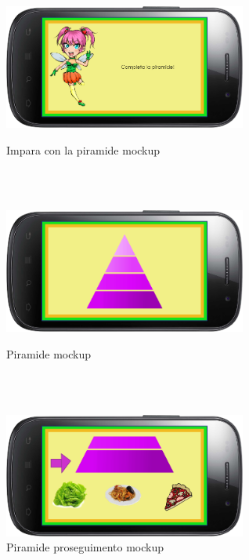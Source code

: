 \begin{figure}
 \begin{minipage}[c]{\columnwidth}
   \centering
   \includegraphics[width=8cm]{Images/Mockup/gioco1}
   \caption{Impara con la piramide mockup}
   \label{fig:Impara con la piramide}
 \end{minipage}
 \ \hspace{8mm} \hspace{8mm} \\\
 
 \begin{minipage}[c]{\columnwidth}
  \centering
   \includegraphics[width=8cm]{Images/Mockup/piramide}
   \caption{Piramide mockup}
   \label{fig:Piramide}
 \end{minipage}
 \ \hspace{8mm} \hspace{8mm} \\\
 
 \begin{minipage}[c]{\columnwidth}
  \centering
   \includegraphics[width=8cm]{Images/Mockup/piramide2}
   \caption{Piramide proseguimento mockup}
   \label{fig:Piramide proseguimento}
 \end{minipage}
\end{figure}
\clearpage

